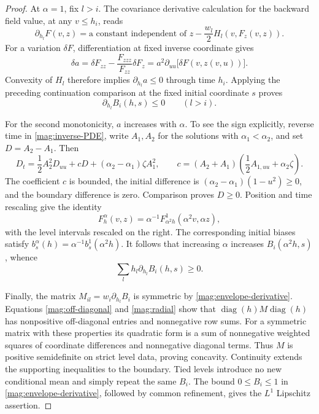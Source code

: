 \begin{proof}
At $\alpha=1$, fix $l>i$. The covariance derivative calculation for the
backward field value, at any $v\le h_i$, reads
\[
 \partial_{h_l}F(v,z)
   =\text{a constant independent of }z
       -\frac{w_l}{2}H_l(v,F_z(v,z)).
\]
For a variation $\delta F$, differentiation at fixed inverse coordinate
gives
\begin{equation}\label{mag:inverse-variation}
 \delta a
   =\delta F_{zz}-\frac{F_{zzz}}{F_{zz}}\delta F_z
   =a^2\partial_{uu}\bigl[\delta F(v,z(v,u))\bigr].
\end{equation}
Convexity of $H_l$ therefore implies $\partial_{h_l}a\le0$ through
time $h_i$. Applying the preceding continuation comparison at the fixed
initial coordinate $s$ proves
\begin{equation}\label{mag:off-diagonal}
 \partial_{h_l}B_i(h,s)\le0\qquad(l>i).
\end{equation}

For the second monotonicity, $a$ increases with $\alpha$.
To see the sign explicitly, reverse time in \eqref{mag:inverse-PDE},
write $A_1,A_2$ for the solutions with $\alpha_1<\alpha_2$, and set
$D=A_2-A_1$. Then
\[
 D_t=\frac12A_2^2D_{uu}+cD
             +(\alpha_2-\alpha_1)\zeta A_1^2,
 \qquad
 c=(A_2+A_1)\left(\frac12A_{1,uu}+\alpha_2\zeta\right).
\]
The coefficient $c$ is bounded, the initial difference is
$(\alpha_2-\alpha_1)(1-u^2)\ge0$, and the boundary difference is zero.
Comparison proves $D\ge0$. Position and time rescaling give the identity
\[
 F_h^\alpha(v,z)
    =\alpha^{-1}F_{\alpha^2h}^{1}(\alpha^2v,\alpha z),
\]
with the level intervals rescaled on the right. The corresponding initial
biases satisfy
$b_s^\alpha(h)=\alpha^{-1}b_s^1(\alpha^2h)$.
It follows that increasing $\alpha$ increases $B_i(\alpha^2h,s)$, whence
\begin{equation}\label{mag:radial}
 \sum_l h_l\partial_{h_l}B_i(h,s)\ge0.
\end{equation}

Finally, the matrix $M_{il}=w_i\partial_{h_l}B_i$ is symmetric by
\eqref{mag:envelope-derivative}. Equations
\eqref{mag:off-diagonal} and \eqref{mag:radial} show that
$\operatorname{diag}(h)M\operatorname{diag}(h)$ has nonpositive
off-diagonal entries and nonnegative row sums. For a symmetric matrix
with these properties its quadratic form is a sum of nonnegative
weighted squares of coordinate differences and nonnegative diagonal
terms. Thus $M$ is positive semidefinite on strict level data, proving
concavity. Continuity extends the supporting inequalities to the
boundary. Tied levels introduce no new conditional mean and simply
repeat the same $B_i$. The bound $0\le B_i\le1$ in
\eqref{mag:envelope-derivative}, followed by common refinement, gives
the $L^1$ Lipschitz assertion.
\end{proof}

